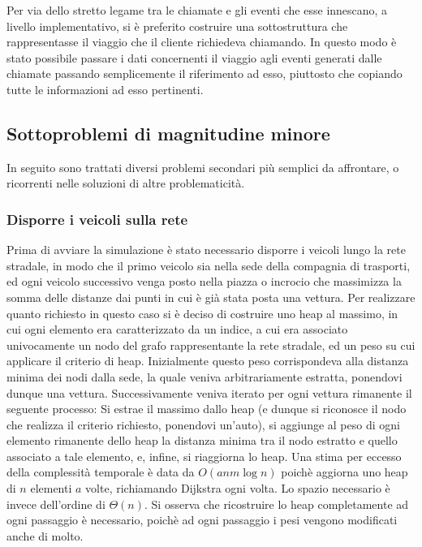 \documentclass[a4paper,11pt]{Article}
\begin{document}
Per via dello stretto legame tra le chiamate e gli eventi che esse innescano, a livello implementativo, si è preferito costruire una sottostruttura che rappresentasse il viaggio che il cliente richiedeva chiamando. In questo modo è stato possibile passare i dati concernenti il viaggio agli eventi generati dalle chiamate passando semplicemente il riferimento ad esso, piuttosto che copiando tutte le informazioni ad esso pertinenti.

\subsection{Sottoproblemi di magnitudine minore}
In seguito sono trattati diversi problemi secondari più semplici da affrontare, o ricorrenti nelle soluzioni di altre problematicità.

\subsubsection{Disporre i veicoli sulla rete}

Prima di avviare la simulazione è stato necessario disporre i veicoli lungo la rete stradale, in modo che il primo veicolo sia nella sede della compagnia di trasporti, ed ogni veicolo successivo venga posto nella piazza o incrocio che massimizza la somma delle distanze dai punti in cui è già stata posta una vettura.
Per realizzare quanto richiesto in questo caso si è deciso di costruire uno heap al massimo, in cui ogni elemento era caratterizzato da un indice, a cui era associato univocamente un nodo del grafo rappresentante la rete stradale, ed un peso su cui applicare il criterio di heap.
Inizialmente questo peso corrispondeva alla distanza minima dei nodi dalla sede, la quale veniva arbitrariamente estratta, ponendovi dunque una vettura. Successivamente veniva iterato per ogni vettura rimanente il seguente processo: Si estrae il massimo dallo heap (e dunque si riconosce il nodo che realizza il criterio richiesto, ponendovi un'auto), si aggiunge al peso di ogni elemento rimanente dello heap la distanza minima tra il nodo estratto e quello associato a tale elemento, e, infine, si riaggiorna lo heap.
Una stima per eccesso della complessità temporale è data da $O(anm\log{n})$ poichè aggiorna uno heap di $n$ elementi $a$ volte, richiamando Dijkstra ogni volta. Lo spazio necessario è invece dell'ordine di $\Theta(n)$.
Si osserva che ricostruire lo heap completamente ad ogni passaggio è necessario, poichè ad ogni passaggio i pesi vengono modificati anche di molto.
\end{document}
